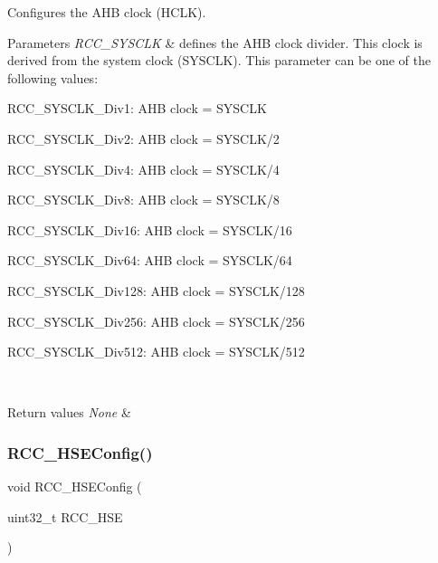 Configures the A\+HB clock (H\+C\+LK). 


\begin{DoxyParams}{Parameters}
{\em R\+C\+C\+\_\+\+S\+Y\+S\+C\+LK} & defines the A\+HB clock divider. This clock is derived from the system clock (S\+Y\+S\+C\+LK). This parameter can be one of the following values\+: \begin{DoxyItemize}
\item R\+C\+C\+\_\+\+S\+Y\+S\+C\+L\+K\+\_\+\+Div1\+: A\+HB clock = S\+Y\+S\+C\+LK \item R\+C\+C\+\_\+\+S\+Y\+S\+C\+L\+K\+\_\+\+Div2\+: A\+HB clock = S\+Y\+S\+C\+L\+K/2 \item R\+C\+C\+\_\+\+S\+Y\+S\+C\+L\+K\+\_\+\+Div4\+: A\+HB clock = S\+Y\+S\+C\+L\+K/4 \item R\+C\+C\+\_\+\+S\+Y\+S\+C\+L\+K\+\_\+\+Div8\+: A\+HB clock = S\+Y\+S\+C\+L\+K/8 \item R\+C\+C\+\_\+\+S\+Y\+S\+C\+L\+K\+\_\+\+Div16\+: A\+HB clock = S\+Y\+S\+C\+L\+K/16 \item R\+C\+C\+\_\+\+S\+Y\+S\+C\+L\+K\+\_\+\+Div64\+: A\+HB clock = S\+Y\+S\+C\+L\+K/64 \item R\+C\+C\+\_\+\+S\+Y\+S\+C\+L\+K\+\_\+\+Div128\+: A\+HB clock = S\+Y\+S\+C\+L\+K/128 \item R\+C\+C\+\_\+\+S\+Y\+S\+C\+L\+K\+\_\+\+Div256\+: A\+HB clock = S\+Y\+S\+C\+L\+K/256 \item R\+C\+C\+\_\+\+S\+Y\+S\+C\+L\+K\+\_\+\+Div512\+: A\+HB clock = S\+Y\+S\+C\+L\+K/512 \end{DoxyItemize}
\\
\hline
\end{DoxyParams}

\begin{DoxyRetVals}{Return values}
{\em None} & \\
\hline
\end{DoxyRetVals}
\mbox{\label{group___r_c_c___exported___functions_ga432b3281546d23345642d55f8670a93d}} 
\subsubsection{\texorpdfstring{RCC\_HSEConfig()}{RCC\_HSEConfig()}}
{\footnotesize\ttfamily void R\+C\+C\+\_\+\+H\+S\+E\+Config (\begin{DoxyParamCaption}\item[{uint32\+\_\+t}]{R\+C\+C\+\_\+\+H\+SE }\end{DoxyParamCaption})}



